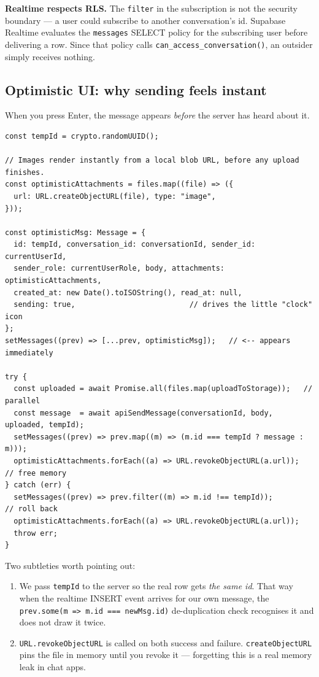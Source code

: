 \documentclass[11pt,a4paper]{article}
\begin{document}
\begin{warnbox}
\textbf{Realtime respects RLS.} The \texttt{filter} in the subscription is not the
security boundary --- a user could subscribe to another conversation's id. Supabase
Realtime evaluates the \texttt{messages} SELECT policy for the subscribing user
before delivering a row. Since that policy calls
\texttt{can\_access\_conversation()}, an outsider simply receives nothing.
\end{warnbox}

\subsection{Optimistic UI: why sending feels instant}

When you press Enter, the message appears \emph{before} the server has heard about
it.

\begin{lstlisting}[language=TS,caption={components/messaging/useConversationMessages.ts --- sendMessage}]
const tempId = crypto.randomUUID();

// Images render instantly from a local blob URL, before any upload finishes.
const optimisticAttachments = files.map((file) => ({
  url: URL.createObjectURL(file), type: "image",
}));

const optimisticMsg: Message = {
  id: tempId, conversation_id: conversationId, sender_id: currentUserId,
  sender_role: currentUserRole, body, attachments: optimisticAttachments,
  created_at: new Date().toISOString(), read_at: null,
  sending: true,                          // drives the little "clock" icon
};
setMessages((prev) => [...prev, optimisticMsg]);   // <-- appears immediately

try {
  const uploaded = await Promise.all(files.map(uploadToStorage));   // parallel
  const message  = await apiSendMessage(conversationId, body, uploaded, tempId);
  setMessages((prev) => prev.map((m) => (m.id === tempId ? message : m)));
  optimisticAttachments.forEach((a) => URL.revokeObjectURL(a.url));  // free memory
} catch (err) {
  setMessages((prev) => prev.filter((m) => m.id !== tempId));        // roll back
  optimisticAttachments.forEach((a) => URL.revokeObjectURL(a.url));
  throw err;
}
\end{lstlisting}

Two subtleties worth pointing out:

\begin{enumerate}[leftmargin=*,noitemsep]
  \item We pass \texttt{tempId} to the server so the real row gets \emph{the same
        id}. That way when the realtime INSERT event arrives for our own message,
        the \texttt{prev.some(m => m.id === newMsg.id)} de-duplication check
        recognises it and does not draw it twice.
  \item \texttt{URL.revokeObjectURL} is called on both success and failure.
        \texttt{createObjectURL} pins the file in memory until you revoke it ---
        forgetting this is a real memory leak in chat apps.
\end{enumerate}
\end{document}
